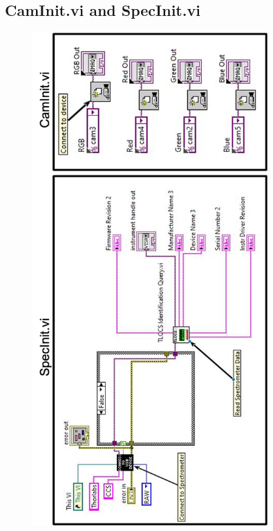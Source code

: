 \subsection{CamInit.vi and SpecInit.vi}
\begin{figure}[h]
\begin{center}
\includegraphics[width=9cm]{Pictures/AppInitvi}
\end{center}
\end{figure}

\newpage
